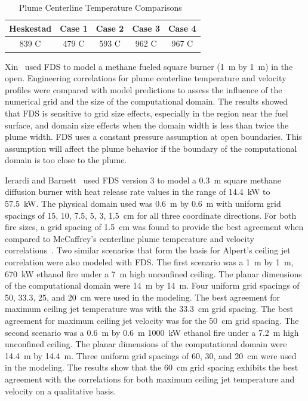 \documentclass[11pt]{book}
\begin{document}
\begin{table}[ht]
\begin{center}
\label{Heskestad} \caption{Plume Centerline Temperature Comparisons~\cite{Bounagui:1}} \vspace{0.1in}
\begin{tabular}{|c|c|c|c|c|}        \hline
Heskestad & Case 1 & Case 2 & Case  3 & Case 4 \\ \hline 839 C & 479 C
& 593 C & 962 C & 967 C \\ \hline
\end{tabular}
\end{center}
\end{table}

Xin~\cite{Xin:NFPA2004}  used FDS  to  model a  methane fueled  square
burner (1~m  by 1~m) in  the open. Engineering correlations  for plume
centerline temperature and velocity  profiles were compared with model
predictions to assess the influence of the numerical grid and the size
of the computational domain. The  results showed that FDS is sensitive
to grid size effects, especially  in the region near the fuel surface,
and domain size  effects when the domain width is  less than twice the
plume  width.  FDS  uses   a  constant  pressure  assumption  at  open
boundaries.  This assumption  will affect  the plume  behavior  if the
boundary of the computational domain is too close to the plume.

Ierardi  and Barnett~\cite{Ierardi:1} used  FDS version  3 to  model a
0.3~m square methane diffusion burner with heat release rate values in
the range of 14.4~kW to 57.5~kW. The physical domain used was 0.6~m by
0.6~m with uniform grid spacings of  15, 10, 7.5, 5, 3, 1.5~cm for all
three coordinate  directions. For both  fire sizes, a grid  spacing of
1.5~cm  was found  to  provide  the best  agreement  when compared  to
McCaffrey's     centerline    plume    temperature     and    velocity
correlations~\cite{SFPE:Heskestad}.  Two similar  scenarios  that form
the basis for Alpert's ceiling  jet correlation were also modeled with
FDS. The first scenario was a  1~m by 1~m, 670~kW ethanol fire under a
7~m   high  unconfined   ceiling.   The  planar   dimensions  of   the
computational domain were 14~m by  14~m. Four uniform grid spacings of
50, 33.3, 25, and 20~cm were  used in the modeling. The best agreement
for  maximum  ceiling  jet  temperature  was  with  the  33.3~cm  grid
spacing. The best  agreement for maximum ceiling jet  velocity was for
the  50~cm grid  spacing. The  second scenario  was a  0.6~m  by 0.6~m
1000~kW ethanol fire under a 7.2~m high unconfined ceiling. The planar
dimensions of  the computational domain  were 14.4~m by  14.4~m. Three
uniform  grid  spacings  of  60,  30,  and  20~cm  were  used  in  the
modeling. The  results show that  the 60~cm grid spacing  exhibits the
best  agreement with  the correlations  for both  maximum  ceiling jet
temperature and velocity on a qualitative basis.
\end{document}
